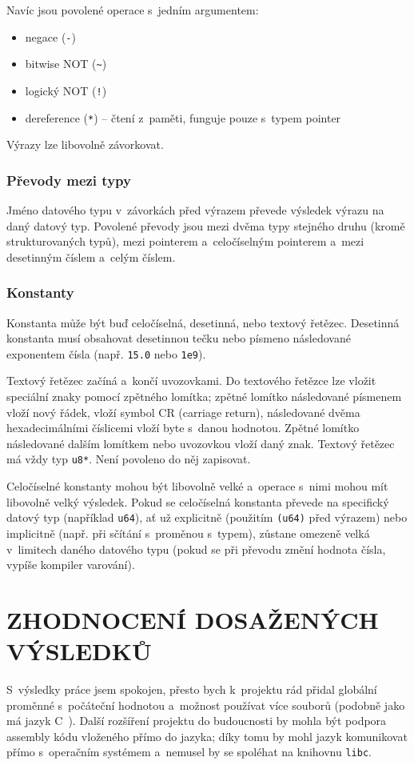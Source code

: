 \documentclass[12pt]{article}
\def\file#1{\texttt{#1}}
\def\code#1{\texttt{#1}}
\begin{document}
Navíc jsou povolené operace s~jedním argumentem:
\begin{itemize}
	\item negace (\code{-})
	\item bitwise NOT (\code{\textasciitilde})
	\item logický NOT (\code{!})
	\item dereference (\code{*}) -- čtení z~paměti, funguje pouze s~typem pointer
\end{itemize}

Výrazy lze libovolně závorkovat.

\subsubsection{Převody mezi typy}
Jméno datového typu v~závorkách před výrazem převede výsledek výrazu na daný datový typ.
Povolené převody jsou mezi dvěma typy stejného druhu (kromě strukturovaných typů),
mezi pointerem a~celočíselným pointerem a~mezi desetinným číslem a~celým číslem.

\subsubsection{Konstanty}
Konstanta může být buď celočíselná, desetinná, nebo textový řetězec.
Desetinná konstanta musí obsahovat desetinnou tečku nebo písmeno  následované exponentem čísla (např. \code{15.0} nebo \code{1e9}).

Textový řetězec začíná a~končí uvozovkami.
Do textového řetězce lze vložit speciální znaky pomocí zpětného lomítka; zpětné lomítko následované písmenem  vloží nový řádek,
 vloží symbol CR (carriage return),  následované dvěma hexadecimálními číslicemi vloží byte s~danou hodnotou.
Zpětné lomítko následované dalším lomítkem nebo uvozovkou vloží daný znak.
Textový řetězec má vždy typ \code{u8*}. Není povoleno do něj zapisovat.

Celočíselné konstanty mohou být libovolně velké a~operace s~nimi mohou mít libovolně velký výsledek.
Pokud se celočíselná konstanta převede na specifický datový typ (například \code{u64}), ať už explicitně (použitím \code{(u64)} před výrazem) nebo implicitně (např. při sčítání s~proměnou s~typem),
zůstane omezeně velká v~limitech daného datového typu (pokud se při převodu změní hodnota čísla, vypíše kompiler varování).


\section{ZHODNOCENÍ DOSAŽENÝCH VÝSLEDKŮ}
S~výsledky práce jsem spokojen, přesto bych k~projektu rád přidal globální proměnné s~počáteční hodnotou a~možnost používat více souborů (podobně jako má jazyk C~\uv{\code{\#inlude}}).
Další rozšíření projektu do budoucnosti by mohla být podpora assembly kódu vloženého přímo do jazyka; díky tomu by mohl jazyk komunikovat přímo s~operačním
systémem a~nemusel by se spoléhat na knihovnu \file{libc}.
\end{document}
